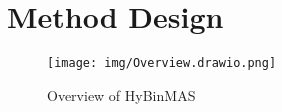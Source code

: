 \documentclass[acmsmall,screen,review,anonymous]{acmart} %
\begin{document}



\section{Method Design}
\begin{figure}[h] %
    \centering
    \texttt{[image: img/Overview.drawio.png]} %
    \caption{Overview of HyBinMAS} %
    \label{fig:overview} %
\end{figure}
\end{document}

